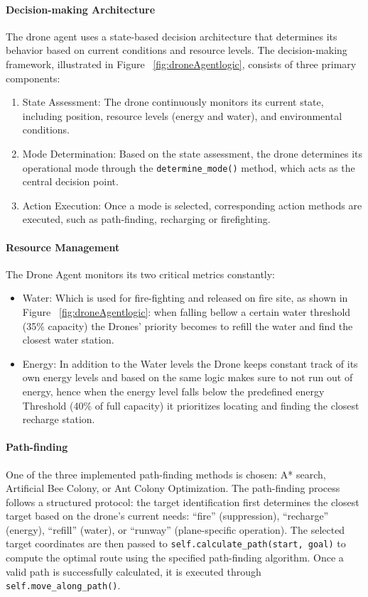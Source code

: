 \documentclass[11pt, a4paper]{article}
\begin{document}
\paragraph{Decision-making Architecture} The drone agent uses a state-based decision architecture that determines its behavior based on current conditions and resource levels. The decision-making framework, illustrated in Figure ~\ref{fig:droneAgentlogic}, consists of three primary components:
\begin{enumerate}
  \item {State Assessment:} The drone continuously monitors its current state, including position, resource levels (energy and water), and environmental conditions.
  
  \item{Mode Determination:} Based on the state assessment, the drone determines its operational mode through the \texttt{determine\_mode()} method, which acts as the central decision point.
  
  \item {Action Execution:} Once a mode is selected, corresponding action methods are executed, such as path-finding, recharging or firefighting.

\end{enumerate}

\paragraph{Resource Management} The Drone Agent monitors its two critical metrics constantly:
\begin{itemize}
  \item {Water:} Which is used for fire-fighting and released on fire site, as shown in Figure ~\ref{fig:droneAgentlogic}: when falling bellow a certain water threshold (35\% capacity) the Drones' priority becomes to refill the water and find the closest water station.
  \item {Energy:} In addition to the Water levels the Drone keeps constant track of its own energy levels and based on the same logic makes sure to not run out of energy, hence when the energy level falls below the predefined energy Threshold (40\% of full capacity) it prioritizes locating and finding the closest recharge station.
\end{itemize}

\paragraph{Path-finding} One of the three implemented path-finding methods is chosen: A* search, Artificial Bee Colony, or Ant Colony Optimization. The path-finding process follows a structured protocol: the target identification first determines the closest target based on the drone's current needs: ``fire'' (suppression), ``recharge'' (energy), ``refill'' (water), or ``runway'' (plane-specific operation). The selected target coordinates are then passed to \texttt{self.calculate\_path(start, goal)} to compute the optimal route using the specified path-finding algorithm. Once a valid path is successfully calculated, it is executed through \texttt{self.move\_along\_path()}.
\end{document}
